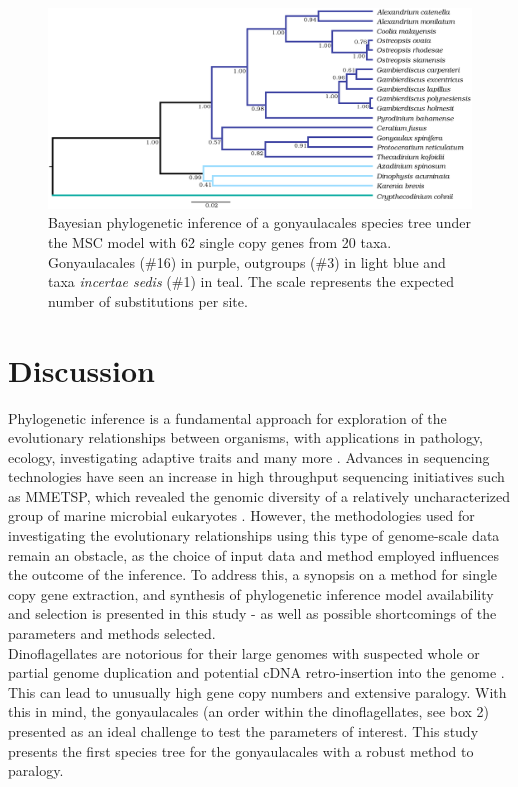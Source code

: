 \documentclass[fleqn,10pt,lineno]{wlpeerj} %
\begin{document}
\begin{figure}[ht]
\centering
\includegraphics[width=\linewidth]{gonya-figs/Aug2-20-taxa-combined-fig-MCC-trees.png} 
\caption{Bayesian phylogenetic inference of a gonyaulacales species tree under the MSC model with 62 single copy genes from 20 taxa. Gonyaulacales (\#16) in purple, outgroups (\#3) in light blue and taxa \textit{incertae sedis} (\#1) in teal. The scale represents the expected number of substitutions per site.} 
\label{fig:SCmscBI}
\end{figure} 


\section*{Discussion}
Phylogenetic inference is a fundamental approach for exploration of the evolutionary relationships between organisms, with applications in pathology, ecology, investigating adaptive traits and many more \citep{heath2008taxon}.
Advances in sequencing technologies have seen an increase in high throughput sequencing initiatives such as MMETSP, which revealed the genomic diversity of a relatively uncharacterized group of marine microbial eukaryotes \citep{keeling2014marine}. 
However, the methodologies used for investigating the evolutionary relationships using this type of genome-scale data remain an obstacle, as the choice of input data and method employed influences the outcome of the inference. 
To address this, a synopsis on a method for single copy gene extraction, and synthesis of phylogenetic inference model availability and selection is presented in this study - as well as possible shortcomings of the parameters and methods selected. \\
Dinoflagellates are notorious for their large genomes with suspected whole or partial genome duplication and potential cDNA retro-insertion into the genome \citep{van2009florida,beauchemin2012dinoflagellate,slamovits2008widespread,hou2009distinct,lin2011genomic}. 
This can lead to unusually high gene copy numbers and extensive paralogy. 
With this in mind, the gonyaulacales (an order within the dinoflagellates, see box 2) presented as an ideal challenge to test the parameters of interest. 
This study presents the first species tree for the gonyaulacales with a robust method to paralogy.
\end{document}
